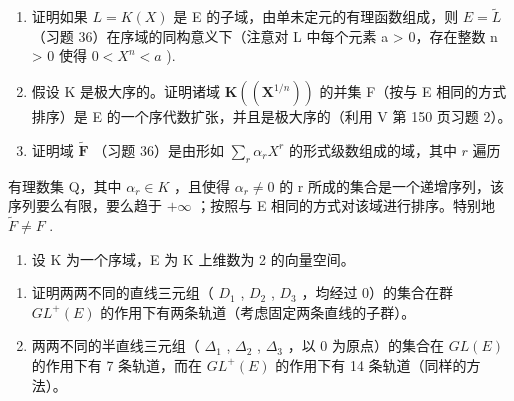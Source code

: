 \begin{enumerate}
\def\labelenumi{\alph{enumi})}
\item
  证明如果 \(L = K(X)\) 是 E 的子域，由单未定元的有理函数组成，则 \(E = \tilde{L}\) （习题 36）在序域的同构意义下（注意对 L 中每个元素 a \textgreater{} 0，存在整数 n \textgreater{} 0 使得 \(0 < X^{n} < a\) ).
\item
  假设 K 是极大序的。证明诸域 \(\mathbf{K}((\mathbf{X}^{1/n}))\) 的并集 F（按与 E 相同的方式排序）是 E 的一个序代数扩张，并且是极大序的（利用 V 第 150 页习题 2）。
\item
  证明域 \(\widetilde{\mathbf{F}}\) （习题 36）是由形如 \(\sum_{r} \alpha_r X^r\) 的形式级数组成的域，其中 \(r\) 遍历
\end{enumerate}

有理数集 Q，其中 \(\alpha_{r} \in K\) ，且使得 \(\alpha_{r} \neq 0\) 的 r 所成的集合是一个递增序列，该序列要么有限，要么趋于 \(+\infty\) ；按照与 E 相同的方式对该域进行排序。特别地 \(\widetilde{F} \neq F\) .

\begin{enumerate}
\def\labelenumi{\arabic{enumi})}
\setcounter{enumi}{40}
\tightlist
\item
  设 K 为一个序域，E 为 K 上维数为 2 的向量空间。
\end{enumerate}

\begin{enumerate}
\def\labelenumi{\alph{enumi})}
\item
  证明两两不同的直线三元组（ \(D_{1}\) , \(D_{2}\) , \(D_{3}\) ，均经过 0）的集合在群 \(GL^{+}(E)\) 的作用下有两条轨道（考虑固定两条直线的子群）。
\item
  两两不同的半直线三元组（ \(\Delta_{1}\) , \(\Delta_{2}\) , \(\Delta_{3}\) ，以 0 为原点）的集合在 \(GL(E)\) 的作用下有 7 条轨道，而在 \(GL^{+}(E)\) 的作用下有 14 条轨道（同样的方法）。
\end{enumerate}

